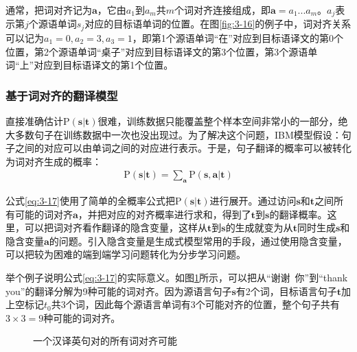 \parinterval 通常，把词对齐记为$\mathbf{a}$，它由$a_1$到$a_m$共$m$个词对齐连接组成，即$\mathbf{a}=a_1...a_m$。$a_j$表示第$j$个源语单词$s_j$对应的目标语单词的位置。在图\ref{fig:3-16}的例子中，词对齐关系可以记为$a_1=0, a_2=3, a_3=1$，即第1个源语单词``在''对应到目标语译文的第0个位置，第2个源语单词``桌子''对应到目标语译文的第3个位置，第3个源语单词``上''对应到目标语译文的第1个位置。


\subsubsection{基于词对齐的翻译模型}

\parinterval 直接准确估计$\textrm{P}(\mathbf{s}|\mathbf{t})$很难，训练数据只能覆盖整个样本空间非常小的一部分，绝大多数句子在训练数据中一次也没出现过。为了解决这个问题，IBM模型假设：句子之间的对应可以由单词之间的对应进行表示。于是，句子翻译的概率可以被转化为词对齐生成的概率：
\begin{eqnarray}
\textrm{P}(\mathbf{s}|\mathbf{t})= \sum_{\mathbf{a}}\textrm{P}(\mathbf{s},\mathbf{a}|\mathbf{t})
\label{eq:3-17}
\end{eqnarray}

\parinterval 公式\ref{eq:3-17}使用了简单的全概率公式把$\textrm{P}(\mathbf{s}|\mathbf{t})$进行展开。通过访问$\mathbf{s}$和$\mathbf{t}$之间所有可能的词对齐$\mathbf{a}$，并把对应的对齐概率进行求和，得到了$\mathbf{t}$到$\mathbf{s}$的翻译概率。这里，可以把词对齐看作翻译的隐含变量，这样从$\mathbf{t}$到$\mathbf{s}$的生成就变为从$\mathbf{t}$同时生成$\mathbf{s}$和隐含变量$\mathbf{a}$的问题。引入隐含变量是生成式模型常用的手段，通过使用隐含变量，可以把较为困难的端到端学习问题转化为分步学习问题。

\parinterval 举个例子说明公式\ref{eq:3-17}的实际意义。如图\ref{fig:3-17}所示，可以把从``谢谢\ 你''到``thank you''的翻译分解为9种可能的词对齐。因为源语言句子$\mathbf{s}$有2个词，目标语言句子$\mathbf{t}$加上空标记$t_0$共3个词，因此每个源语言单词有3个可能对齐的位置，整个句子共有$3\times3=9$种可能的词对齐。

\begin{figure}[htp]
    \centering

    \caption{一个汉译英句对的所有词对齐可能}
    \label{fig:3-17}
\end{figure}

